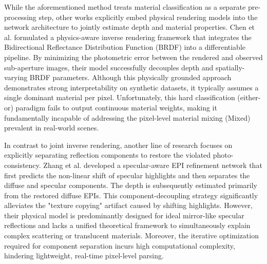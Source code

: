 \documentclass[lettersize,journal]{IEEEtran}
\begin{document}
While the aforementioned method treats material classification as a separate pre-processing step, other works explicitly embed physical rendering models into the network architecture to jointly estimate depth and material properties. Chen et al. \cite{physicsbasedlightfieldinve} formulated a physics-aware inverse rendering framework that integrates the Bidirectional Reflectance Distribution Function (BRDF) into a differentiable pipeline. By minimizing the photometric error between the rendered and observed sub-aperture images, their model successfully decouples depth and spatially-varying BRDF parameters. Although this physically grounded approach demonstrates strong interpretability on synthetic datasets, it typically assumes a single dominant material per pixel. Unfortunately, this hard classification (either-or) paradigm fails to output continuous material weights, making it fundamentally incapable of addressing the pixel-level material mixing (Mixed) prevalent in real-world scenes.

In contrast to joint inverse rendering, another line of research focuses on explicitly separating reflection components to restore the violated photo-consistency. Zhang et al. \cite{specularseparationlightfiel} developed a specular-aware EPI refinement network that first predicts the non-linear shift of specular highlights and then separates the diffuse and specular components. The depth is subsequently estimated primarily from the restored diffuse EPIs. This component-decoupling strategy significantly alleviates the "texture copying" artifact caused by shifting highlights. However, their physical model is predominantly designed for ideal mirror-like specular reflections and lacks a unified theoretical framework to simultaneously explain complex scattering or translucent materials. Moreover, the iterative optimization required for component separation incurs high computational complexity, hindering lightweight, real-time pixel-level parsing.
\end{document}
